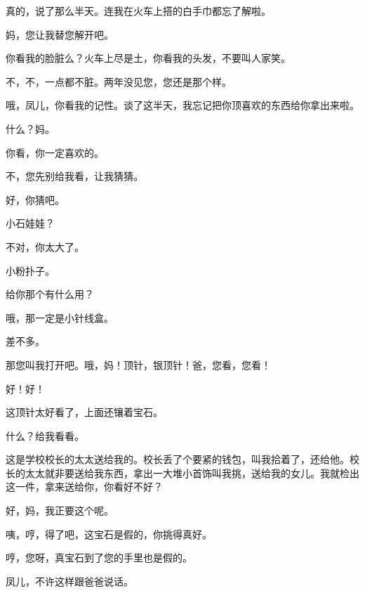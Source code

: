 真的，说了那么半天。连我在火车上搭的白手巾都忘了解啦。

妈，您让我替您解开吧。

你看我的脸脏么？火车上尽是土，你看我的头发，不要叫人家笑。

不，不，一点都不脏。两年没见您，您还是那个样。

哦，凤儿，你看我的记性。谈了这半天，我忘记把你顶喜欢的东西给你拿出来啦。

什么？妈。

你看，你一定喜欢的。

不，您先别给我看，让我猜猜。

好，你猜吧。

小石娃娃？

不对，你太大了。

小粉扑子。

给你那个有什么用？

哦，那一定是小针线盒。

差不多。

那您叫我打开吧。哦，妈！顶针，银顶针！爸，您看，您看！

好！好！

这顶针太好看了，上面还镶着宝石。

什么？给我看看。

这是学校校长的太太送给我的。校长丢了个要紧的钱包，叫我拾着了，还给他。校长的太太就非要送给我东西，拿出一大堆小首饰叫我挑，送给我的女儿。我就检出这一件，拿来送给你，你看好不好？

好，妈，我正要这个呢。

咦，哼，得了吧，这宝石是假的，你挑得真好。

哼，您呀，真宝石到了您的手里也是假的。

凤儿，不许这样跟爸爸说话。

